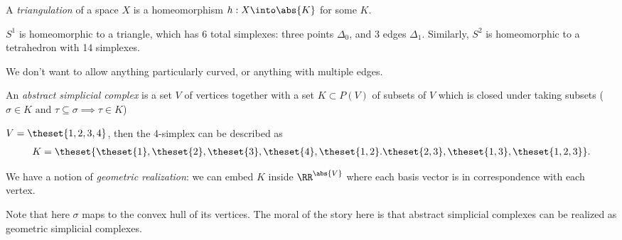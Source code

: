 \begin{definition}[Triangulation]

A \emph{triangulation} of a space \(X\) is a homeomorphism
\(h: X \into \abs{K}\) for some \(K\).

\end{definition}

\begin{example}

\(S^1\) is homeomorphic to a triangle, which has 6 total simplexes:
three points \(\Delta_0\), and 3 edges \(\Delta_1\). Similarly, \(S^2\)
is homeomorphic to a tetrahedron with 14 simplexes.

\end{example}

\begin{remark}

We don't want to allow anything particularly curved, or anything with
multiple edges.

\end{remark}

\begin{definition}

An \emph{abstract simplicial complex} is a set \(V\) of vertices
together with a set \(K \subset P(V)\) of subsets of \(V\) which is
closed under taking subsets
(\(\sigma \in K \text{ and } \tau \subseteq \sigma \implies \tau \in K\))

\end{definition}

\begin{example}

\(V = \theset{1,2,3,4}\), then the 4-simplex can be described as
\begin{align*}
K = \theset{\theset{1}, \theset{2}, \theset{3}, \theset{4}, \theset{1,2}. \theset{2,3}, \theset{1,3}, \theset{1,2,3}}
.\end{align*}

\end{example}

\begin{definition}

We have a notion of \emph{geometric realization}: we can embed \(K\)
inside \(\RR^{\abs{V}}\) where each basis vector is in correspondence
with each vertex.

\end{definition}

\begin{remark}

Note that here \(\sigma\) maps to the convex hull of its vertices. The
moral of the story here is that abstract simplicial complexes can be
realized as geometric simplicial complexes.

\end{remark}

